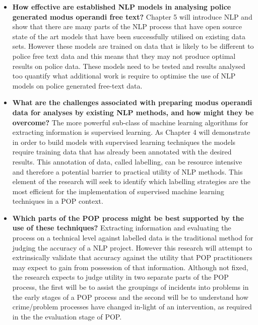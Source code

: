 \begin{itemize}
\item {\bf How effective are established NLP models in analysing police generated modus operandi free text?} Chapter 5 will introduce NLP and show that there are many parts of the NLP process that have open source state of the art models that have been successfully utilised on existing data sets. However these models are trained on data that is likely to be different to police free text data and this means that they may not produce optimal results on police data. These models need to be tested and results analysed too quantify what additional work is require to optimise the use of NLP models on police generated free-text data.

\item {\bf What are the challenges associated with preparing modus operandi data for analyses by existing NLP methods, and how might they be overcome?}  The more powerful sub-class of machine learning algorithms for extracting information is supervised learning. As Chapter 4 will demonstrate in order to build models with supervised learning techniques the models require training data that has already been annotated with the desired results. This annotation of data, called labelling,  can be resource intensive and therefore a potential barrier to practical utility of NLP methods.  This element of the research will seek to identify which labelling strategies are the most efficient for the implementation of supervised machine learning techniques in a POP context. 

\item {\bf Which parts of the POP process might be best supported by the use of these techniques?}  Extracting information and evaluating the process on a technical level against labelled data is the traditional method for judging the accuracy of a NLP project. However this research will attempt to extrinsically validate that accuracy against the utility that POP practitioners may expect to gain from possession of that information. Although not fixed, the research expects to judge utility in two separate parts of the POP process, the first will be to assist the groupings of incidents into problems in the early stages of a POP process and the second will be to understand how crime/problem processes have changed in-light of an intervention, as required in the the evaluation stage of POP.   

\end{itemize}

